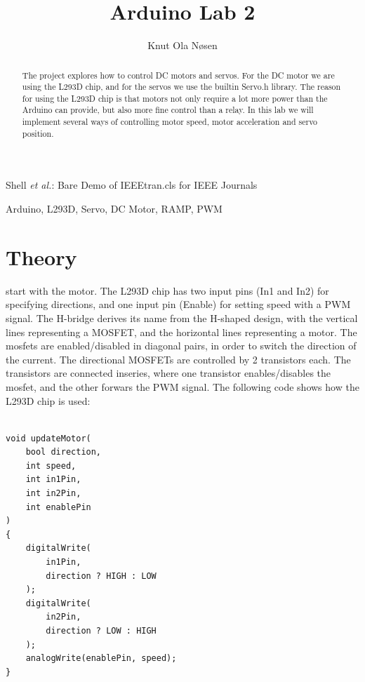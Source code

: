 \documentclass[journal]{IEEEtran}
\begin{document}
\title{Arduino Lab 2}

\author{Knut Ola Nøsen
}%

{Shell \MakeLowercase{\textit{et al.}}: Bare Demo of IEEEtran.cls for IEEE Journals}

\maketitle

\begin{abstract}
    The project explores how to control DC motors and servos. For the DC motor we are using the L293D chip, and for the servos we use the builtin Servo.h library.
    The reason for using the L293D chip is that motors not only require a lot more power than the Arduino can provide, but also more fine control than a relay.
    In this lab we will implement several ways of controlling motor speed, motor acceleration and servo position.
\end{abstract}

\begin{IEEEkeywords}
    Arduino, L293D, Servo, DC Motor, RAMP, PWM
\end{IEEEkeywords}

\section{Theory}

start with the motor.
The L293D chip has two input pins (In1 and In2) for
specifying directions, and one input pin (Enable) for
setting speed with a PWM signal. The H-bridge derives its
name from the H-shaped design, with the vertical lines representing
a MOSFET, and the horizontal lines representing a motor.
The mosfets are enabled/disabled in diagonal pairs, in order to switch
the direction of the current. The directional MOSFETs are controlled by
2 transistors each. The transistors are connected inseries, where one
transistor enables/disables the mosfet, and the other forwars the PWM signal.
The following code shows how the L293D chip is used:
\begin{lstlisting}
   
void updateMotor(
    bool direction, 
    int speed, 
    int in1Pin, 
    int in2Pin, 
    int enablePin
)
{
    digitalWrite(
        in1Pin, 
        direction ? HIGH : LOW
    );
    digitalWrite(
        in2Pin, 
        direction ? LOW : HIGH
    );
    analogWrite(enablePin, speed);
}

\end{lstlisting}
\end{document}
